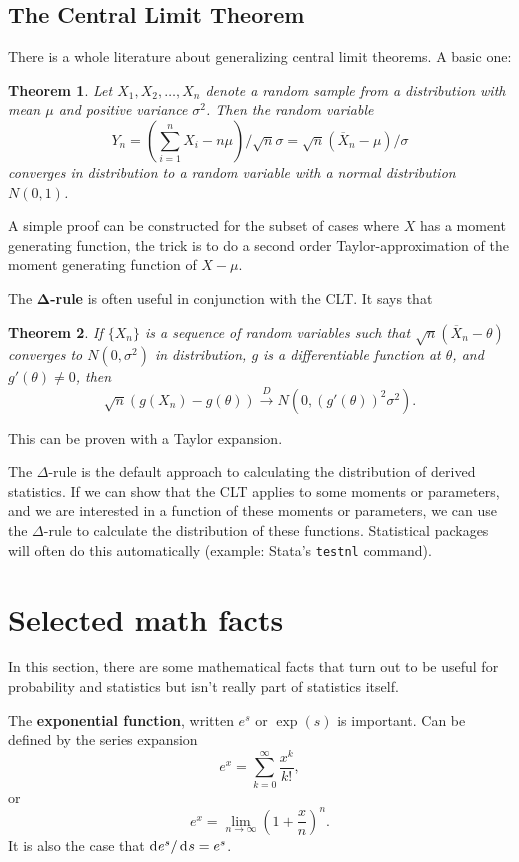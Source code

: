 \documentclass[10pt]{article}
\newtheorem{theorem}{Theorem}%
\begin{document}
\subsection{The Central Limit Theorem}
There is a whole literature about generalizing central limit theorems. A basic one:

\begin{theorem}
Let $X_1,X_2,\dots,X_n$ denote a random sample from a distribution with mean
$\mu$ and positive variance $\sigma^2$. Then the random variable \[ Y_n =
\left(\sum_{i=1}^n X_i - n\mu \right)/\sqrt{n}\sigma =
\sqrt{n}(\overline{X}_n-\mu)/\sigma\] converges in distribution to a random
variable with a normal distribution $N(0,1)$. 
\end{theorem}

A simple proof can be constructed for the subset of cases where $X$ has a moment generating
function, the trick is to do a second order Taylor-approximation of the moment generating
function of $X-\mu$. 

The $\mathbf{\Delta}$\textbf{-rule} is often useful in conjunction with the CLT.
It says that 

\begin{theorem}
If $\{X_n\}$ is a sequence of random variables such that $\sqrt{n}(\overline{X}_n-\theta)$
converges to $N(0,\sigma^2)$ in distribution, $g$ is a differentiable function at $\theta$,
and $g'(\theta)\neq 0$, then 
\[ \sqrt{n}\left(g(X_n) - g(\theta)\right) \xrightarrow{D} 
N\left(0, \left(g'(\theta)\right)^2\sigma^2\right).\]
\end{theorem}
This can be proven with a Taylor expansion. 

The $\Delta$-rule is the default approach to calculating the distribution of derived
statistics. If we can show that the CLT applies to some moments or parameters,
and we are interested in a function of these moments or parameters, we can use the 
$\Delta$-rule to calculate the distribution of these functions. Statistical packages
will often do this automatically (example: Stata's \texttt{testnl} command).

\section{Selected math facts}
In this section, there are some mathematical facts that turn out to be useful
for probability and statistics but isn't really part of statistics itself.

The \textbf{exponential function}, written $e^s$ or $\exp(s)$ is important. Can be defined by the
series expansion \[ e^x = \sum_{k=0}^\infty \frac{x^k}{k!},\] or
\[ e^x = \lim_{n\rightarrow \infty} \left( 1 + \frac{x}{n} \right)^n. \]
It is also the case that  $\rd e^s / \rd s =e^s$.
\end{document}
